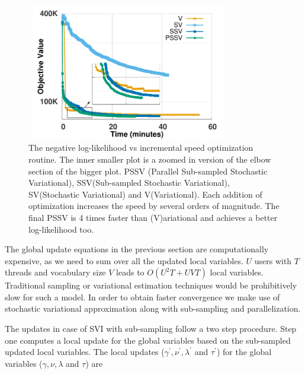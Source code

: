 \documentclass{sig-alternate}
\newcommand{\abhi}[1]{\textcolor{blue}{\\ abhi-comment: #1}}
\begin{document}
\begin{figure}
\begin{center}
\includegraphics[height=6cm,width=9cm]{figs/parallel_model_comparison.pdf}
\end{center}
\vspace*{-2\baselineskip}
\caption{\small{The negative log-likelihood vs incremental speed optimization routine. 
The inner smaller plot is a zoomed in version of the elbow section of the 
bigger plot. PSSV
(Parallel Sub-sampled Stochastic Variational), SSV(Sub-sampled Stochastic
Variational), SV(Stochastic Variational) and V(Variational). Each addition of
optimization increases the speed by several orders of magnitude. The final PSSV
is 4 times faster than (V)ariational and achieves a better log-likelihood too.
}}
\label{fig:SpeedOptimization}
\vspace*{-1\baselineskip}
\end{figure}
The global update equations in the previous section are computationally
expensive, as we need to sum over all the updated local
variables. $U$ users with $T$ threads and vocabulary size $V$ leads to
$O(U^2T+UVT)$ local variables. Traditional sampling or 
variational estimation techniques would be prohibitively slow for such a model. In order to obtain faster convergence we
make use of stochastic variational approximation along with sub-sampling and parallelization. 

The updates in case of SVI with sub-sampling follow a two step procedure. Step
one computes a local update for the global variables based on the sub-sampled
updated local variables. The local updates ($\gamma^{'},
\nu^{'}, \lambda^{'}$ and $\tau^{'}$) for the global variables ($\gamma,
\nu, \lambda$ and $\tau$) are
\end{document}
